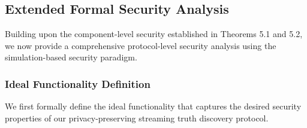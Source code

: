 
\subsection{Extended Formal Security Analysis}

Building upon the component-level security established in Theorems 5.1 and 5.2, we now provide a comprehensive protocol-level security analysis using the simulation-based security paradigm.

\subsubsection{Ideal Functionality Definition}

We first formally define the ideal functionality that captures the desired security properties of our privacy-preserving streaming truth discovery protocol.

